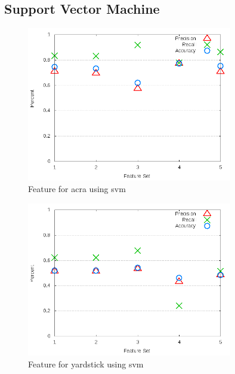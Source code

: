 \subsection{Support Vector Machine}
\label{app_sub:experiment_2_svm}

\begin{figure}
\centering
\includegraphics[width=0.8\textwidth]{images/svm/test_3/acra_sample_range.png}
\caption{Feature for acra using \gls{svm}}
\label{fig:test_3_acra_svm}
\end{figure}

\begin{figure}
\centering
\includegraphics[width=0.8\textwidth]{images/svm/test_3/yardstick_sample_range.png}
\caption{Feature for yardstick using \gls{svm}}
\label{fig:test_3_yardstick_svm}
\end{figure}

\clearpage

